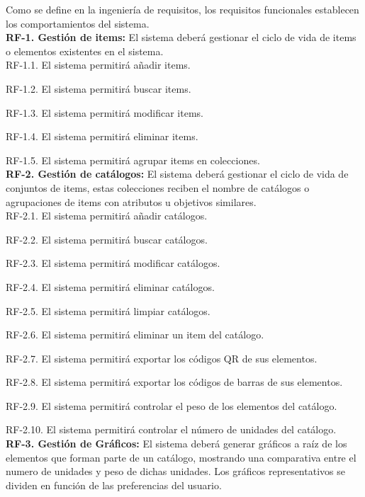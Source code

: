 \documentclass[a4paper,11pt]{book}
\begin{document}
Como se define en la ingeniería de requisitos, los requisitos funcionales establecen los comportamientos del sistema.\\

\textbf{RF-1. Gestión de items:} El sistema deberá gestionar el ciclo de vida de items o elementos existentes en el sistema.\\
   

	RF-1.1. El sistema permitirá añadir items.

	RF-1.2. El sistema permitirá buscar items.

	RF-1.3. El sistema permitirá modificar items.

	RF-1.4. El sistema permitirá eliminar items.

	RF-1.5. El sistema permitirá agrupar items en colecciones.\\


\textbf{RF-2. Gestión de catálogos:} El sistema deberá gestionar el ciclo de vida de conjuntos de items, estas colecciones reciben el nombre de catálogos o agrupaciones de items con atributos u objetivos similares.\\   


	RF-2.1. El sistema permitirá añadir catálogos.

	RF-2.2. El sistema permitirá buscar catálogos.

	RF-2.3. El sistema permitirá modificar catálogos.

	RF-2.4. El sistema permitirá eliminar catálogos.

	RF-2.5. El sistema permitirá limpiar catálogos.

	RF-2.6. El sistema permitirá eliminar un item del catálogo.

	RF-2.7. El sistema permitirá exportar los códigos QR de sus elementos.

	RF-2.8. El sistema permitirá exportar los códigos de barras de sus elementos.

	RF-2.9. El sistema permitirá controlar el peso de los elementos del catálogo.

	RF-2.10. El sistema permitirá controlar el número de unidades del catálogo. \\
	

\textbf{RF-3. Gestión de Gráficos:} El sistema deberá generar gráficos a raíz de los elementos que forman parte de un catálogo, mostrando una comparativa entre el numero de unidades y peso de dichas unidades. Los gráficos representativos se dividen en función de las preferencias del usuario.\\ 
\end{document}
